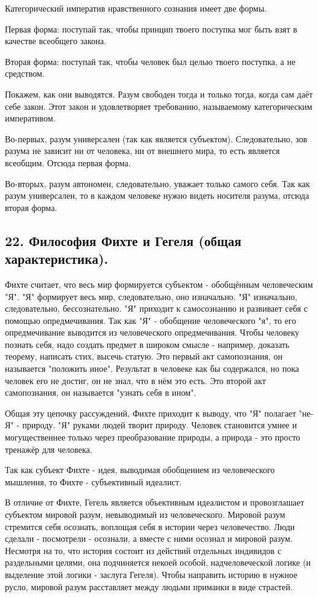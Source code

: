 \documentclass[a4paper, 12pt]{article}
\begin{document}
Категорический императив нравственного сознания имеет две формы.

Первая форма: поступай так, чтобы принцип твоего поступка мог быть взят в качестве всеобщего закона.

Вторая форма: поступай так, чтобы человек был целью твоего поступка, а не средством.

Покажем, как они выводятся.
Разум свободен тогда и только тогда, когда сам даёт себе закон.
Этот закон и удовлетворяет требованию, называемому категорическим императивом.

Во-первых, разум универсален (так как является субъектом).
Следовательно, зов разума не зависит ни от человека, ни от внешнего мира, то есть является всеобщим.
Отсюда первая форма.

Во-вторых, разум автономен, следовательно, уважает только самого себя.
Так как разум универсален, то в каждом человеке нужно видеть носителя разума, отсюда вторая форма.


\subsection*{\textbf{22. Философия Фихте и Гегеля (общая характеристика).}}

Фихте считает, что весь мир формируется субъектом - обобщённым человеческим "Я".
"Я" формирует весь мир, следовательно, оно изначально.
"Я" изначально, следовательно, бессознательно.
"Я" приходит к самосознанию и развивает себя с помощью опредмечивания.
Так как "Я" - обобщение человеческого "я", то его опредмечивание выводится из человеческого опредмечивания.
Чтобы человеку познать себя, надо создать предмет в широком смысле - например, доказать теорему, написать стих, высечь статую.
Это первый акт самопознания, он называется "положить иное".
Результат в человеке как бы содержался, но пока человек его не достиг, он не знал, что в нём это есть.
Это второй акт самопознания, он называется "узнать себя в ином".

Общая эту цепочку рассуждений, Фихте приходит к выводу, что "Я" полагает "не-Я" - природу.
"Я" руками людей творит природу.
Человек становится умнее и могущественнее только через преобразование природы, а природа - это просто тренажёр для человека.

Так как субъект Фихте - идея, выводимая обобщением из человеческого мышления, то Фихте - субъективный идеалист.

В отличие от Фихте, Гегель является объективным идеалистом и провозглашает субъектом мировой разум, невыводимый из человеческого.
Мировой разум стремится себя осознать, воплощая себя в истории через человечество.
Люди сделали - посмотрели - осознали, а вместе с ними осознал и мировой разум.
Несмотря на то, что история состоит из действий отдельных индивидов с раздельными целями, она подчиняется некоей особой, надчеловеческой логике (и выделение этой логики - заслуга Гегеля).
Чтобы направить историю в нужное русло, мировой разум расставляет между людьми приманки в виде страстей.
\end{document}
